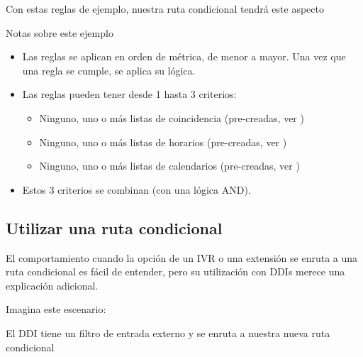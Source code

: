 \documentclass[letterpaper,10pt,spanish]{sphinxmanual}
\begin{document}
\noindent{}

Con estas reglas de ejemplo, nuestra ruta condicional tendrá este aspecto

\noindent{}

Notas sobre este ejemplo
\begin{itemize}
\item {} 
Las reglas se aplican en orden de métrica, de menor a mayor. Una vez que una regla se cumple, se aplica su lógica.

\item {} 
Las reglas pueden tener desde 1 hasta 3 criterios:
\begin{itemize}
\item {} 
Ninguno, uno o más listas de coincidencia (pre-creadas, ver {\hyperref[pbx_features/match_lists:match\string-lists]{}})

\item {} 
Ninguno, uno o más listas de horarios (pre-creadas, ver {\hyperref[pbx_features/external_filters:schedules]{}})

\item {} 
Ninguno, uno o más listas de calendarios (pre-creadas, ver {\hyperref[pbx_features/external_filters:calendars]{}})

\end{itemize}

\item {} 
Estos 3 criterios se combinan (con una lógica AND).

\end{itemize}


\subsection{Utilizar una ruta condicional}
\label{pbx_features/conditional_routes:using-a-conditional-route}
El comportamiento cuando la opción de un IVR o una extensión se enruta a una ruta condicional es fácil de entender, pero su utilización con DDIs merece una explicación adicional.

Imagina este escenario:

\noindent{}

El DDI tiene un filtro de entrada externo y se enruta a nuestra nueva ruta condicional
\end{document}
